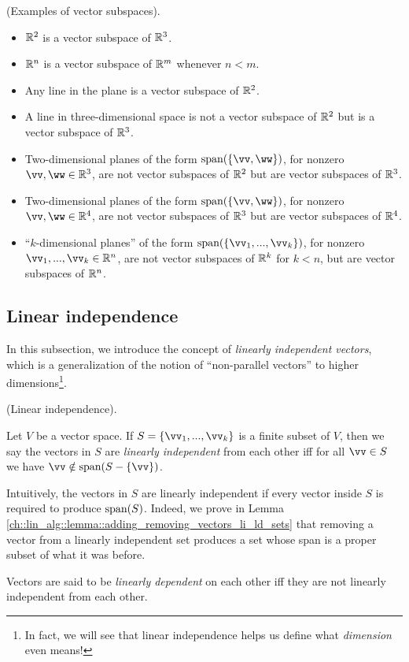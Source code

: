 \begin{remark}
    (Examples of vector subspaces).
    
    \begin{itemize}
        \item $\mathbb{R}^2$ is a vector subspace of $\mathbb{R}^3$.
        \item $\mathbb{R}^n$ is a vector subspace of $\mathbb{R}^m$ whenever $n < m$.
        \item Any line in the plane is a vector subspace of $\mathbb{R}^2$.
        \item A line in three-dimensional space is not a vector subspace of $\mathbb{R}^2$ but is a vector subspace of $\mathbb{R}^3$.
        \item Two-dimensional planes of the form $\spann(\{\vv, \ww\})$, for nonzero $\vv, \ww \in \R^3$, are not vector subspaces of $\mathbb{R}^2$ but are vector subspaces of $\mathbb{R}^3$.
        \item Two-dimensional planes of the form $\spann(\{\vv, \ww\})$, for nonzero $\vv, \ww \in \R^4$, are not vector subspaces of $\mathbb{R}^3$ but are vector subspaces of $\mathbb{R}^4$.
        \item ``$k$-dimensional planes'' of the form $\spann(\{\vv_1, ..., \vv_k\})$, for nonzero $\vv_1, ..., \vv_k \in \R^n$, are not vector subspaces of $\mathbb{R}^k$ for $k < n$, but are vector subspaces of $\mathbb{R}^n$.
    \end{itemize}
\end{remark}

\newpage

\subsection*{Linear independence}

In this subsection, we introduce the concept of \textit{linearly independent vectors}, which is a generalization of the notion of ``non-parallel vectors'' to higher dimensions\footnote{In fact, we will see that linear independence helps us define what \textit{dimension} even means!}.

\begin{defn}
    (Linear independence).
    
    Let $V$ be a vector space. If $S = \{\vv_1, ..., \vv_k\}$ is a finite subset of $V$, then we say the vectors in $S$ are \textit{linearly independent} from each other iff for all $\vv \in S$ we have $\vv \notin \spann(S - \{\vv\})$.
    
    Intuitively, the vectors in $S$ are linearly independent if every vector inside $S$ is required to produce $\text{span}(S)$. Indeed, we prove in Lemma \ref{ch::lin_alg::lemma::adding_removing_vectors_li_ld_sets} that removing a vector from a linearly independent set produces a set whose span is a proper subset of what it was before.
    
    Vectors are said to be \textit{linearly dependent} on each other iff they are not linearly independent from each other.
\end{defn}

